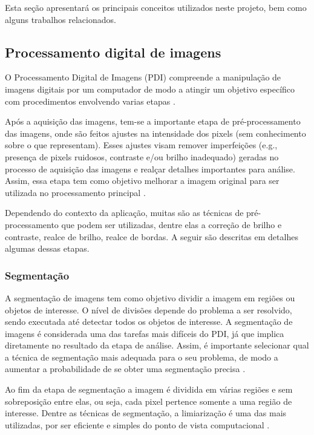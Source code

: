 \documentclass[12pt, a4paper, english, brazil]{article}
\begin{document}
Esta seção apresentará os principais conceitos utilizados neste projeto, bem como alguns trabalhos relacionados.

\subsection{Processamento digital de imagens}

O Processamento Digital de Imagens (PDI) compreende a manipulação de imagens digitais por um computador de modo a atingir um objetivo específico com procedimentos envolvendo varias etapas \cite{Gonzalez_Woods_2010}.

Após a aquisição das imagens, tem-se a importante etapa de pré-processamento das imagens, onde são feitos ajustes na intensidade dos pixels (sem conhecimento sobre o que representam). Esses ajustes visam remover imperfeições (e.g., presença de pixels ruidosos, contraste e/ou brilho inadequado) geradas no processo de aquisição das imagens e realçar detalhes importantes para análise. Assim, essa etapa tem como objetivo melhorar a imagem original para ser utilizada no processamento principal \cite{Marques_Filho_1999}.

Dependendo do contexto da aplicação, muitas são as técnicas de pré-processamento que podem ser utilizadas, dentre elas a correção de brilho e contraste, realce de brilho, realce de bordas. A seguir são descritas em detalhes algumas dessas etapas.

\subsubsection{Segmentação}

A segmentação de imagens tem como objetivo dividir a imagem em regiões ou objetos de interesse. O nível de divisões depende do problema a ser resolvido, sendo executada até detectar todos os objetos de interesse. A segmentação de imagens é considerada uma das tarefas mais difíceis do PDI, já que implica diretamente no resultado da etapa de análise. Assim, é importante selecionar qual a técnica de segmentação mais adequada para o seu problema, de modo a aumentar a probabilidade de se obter uma segmentação precisa \cite{Gonzalez_Woods_2010}.

Ao fim da etapa de segmentação a imagem é dividida em várias regiões e sem sobreposição entre elas, ou seja, cada pixel pertence somente a uma região de interesse. Dentre as técnicas de segmentação, a limiarização é uma das mais utilizadas, por ser eficiente e simples do ponto de vista computacional \cite{Kuruvilla_2016}.
\end{document}
